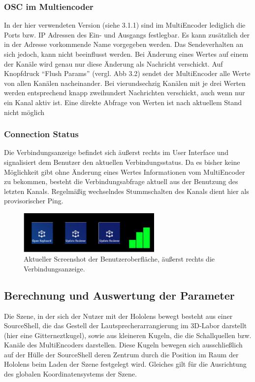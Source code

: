 \documentclass[11pt, titlepage, fleqn]{report}
\begin{document}
                \subsubsection{OSC im Multiencoder}
                    In der hier verwendeten Version (siehe 3.1.1) sind im MultiEncoder lediglich die Ports bzw. IP Adressen des 
                    Ein- und Ausgangs festlegbar. Es kann zusätzlich der in der Adresse vorkommende Name vorgegeben werden. 
                    Das Sendeverhalten an sich jedoch, kann nicht beeinflusst werden. Bei Änderung eines Wertes auf einem der 
                    Kanäle wird genau nur diese Änderung als Nachricht verschickt. Auf Knopfdruck “Flush Params” (vergl. Abb 3.2) sendet der MultiEncoder 
                    alle Werte von allen Kanälen nacheinander. Bei vierundsechzig Kanälen mit je drei Werten werden entsprechend knapp 
                    zweihundert Nachrichten verschickt, auch wenn nur ein Kanal aktiv ist. Eine direkte Abfrage von Werten ist nach 
                    aktuellem Stand nicht möglich
                \subsubsection{Connection Status}
                    Die Verbindungsanzeige befindet sich äußerst rechts im User Interface und signalisiert dem Benutzer den aktuellen Verbindungsstatus. 
                    Da es bisher keine Möglichkeit gibt ohne Änderung eines Wertes Informationen vom MultiEncoder zu bekommen, besteht die 
                    Verbindungsabfrage aktuell aus der Benutzung des letzten Kanals. Regelmäßig wechselndes Stummschalten des Kanals dient 
                    hier als provisorischer Ping.
                    \begin{figure}[htbp]
                        \centering
                        \includegraphics[width=7cm]{./img/status.png}
                        \caption{ Aktueller Screenshot der Benutzeroberfläche, äußerst rechts die Verbindungsanzeige.
                        \label{fig:status}}
                    \end{figure}
            \newpage 
            \subsection{Berechnung und Auswertung der Parameter}
            \label{sec:3.2.3}
                Die Szene, in der sich der Nutzer mit der Hololens bewegt besteht aus einer SourceShell, die das Gestell der 
                Lautsprecherarrangierung im 3D-Labor darstellt (hier eine Gitterneztkugel), sowie aus kleineren Kugeln, die die 
                Schallquellen bzw. Kanäle des MultiEncoders darstellen. Diese Kugeln bewegen sich ausschließlich auf der Hülle der 
                SourceShell deren Zentrum durch die Position im Raum der Hololens beim Laden der Szene festgelegt wird. Gleiches gilt 
                für die Ausrichtung des globalen Koordinatensystems der Szene.
\end{document}
